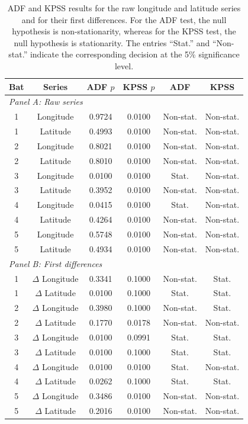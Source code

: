 \documentclass[preprint,12pt,authoryear]{elsarticle}
\begin{document}
\begin{table}[!h]
\centering
\normalsize
\setlength{\tabcolsep}{3pt}
\renewcommand{\arraystretch}{0.85}
\begin{tabular}{@{}cccccc@{}}
\toprule
\textbf{Bat} & \textbf{Series} & \textbf{ADF $p$} & \textbf{KPSS $p$} & \textbf{ADF} & \textbf{KPSS} \\
\midrule
\multicolumn{6}{l}{\textit{Panel A: Raw series}} \\
\midrule
1 & Longitude & 0.9724 & 0.0100 & Non-stat. & Non-stat. \\
1 & Latitude  & 0.4993 & 0.0100 & Non-stat. & Non-stat. \\
2 & Longitude & 0.8021 & 0.0100 & Non-stat. & Non-stat. \\
2 & Latitude  & 0.8010 & 0.0100 & Non-stat. & Non-stat. \\
3 & Longitude & 0.0100 & 0.0100 & Stat.     & Non-stat. \\
3 & Latitude  & 0.3952 & 0.0100 & Non-stat. & Non-stat. \\
4 & Longitude & 0.0415 & 0.0100 & Stat.     & Non-stat. \\
4 & Latitude  & 0.4264 & 0.0100 & Non-stat. & Non-stat. \\
5 & Longitude & 0.5748 & 0.0100 & Non-stat. & Non-stat. \\
5 & Latitude  & 0.4934 & 0.0100 & Non-stat. & Non-stat. \\
\midrule
\multicolumn{6}{l}{\textit{Panel B: First differences}} \\
\midrule
1 & $\Delta$ Longitude & 0.3341 & 0.1000 & Non-stat. & Stat.     \\
1 & $\Delta$ Latitude  & 0.0100 & 0.1000 & Stat.     & Stat.     \\
2 & $\Delta$ Longitude & 0.3980 & 0.1000 & Non-stat. & Stat.     \\
2 & $\Delta$ Latitude  & 0.1770 & 0.0178 & Non-stat. & Non-stat. \\
3 & $\Delta$ Longitude & 0.0100 & 0.0991 & Stat.     & Stat.     \\
3 & $\Delta$ Latitude  & 0.0100 & 0.1000 & Stat.     & Stat.     \\
4 & $\Delta$ Longitude & 0.0100 & 0.0100 & Stat.     & Non-stat. \\
4 & $\Delta$ Latitude  & 0.0262 & 0.1000 & Stat.     & Stat.     \\
5 & $\Delta$ Longitude & 0.3486 & 0.0100 & Non-stat. & Non-stat. \\
5 & $\Delta$ Latitude  & 0.2016 & 0.0100 & Non-stat. & Non-stat. \\
\bottomrule
\end{tabular}
\caption{ADF and KPSS results for the raw longitude and latitude series and for their first differences. For the ADF test, the null hypothesis is non-stationarity, whereas for the KPSS test, the null hypothesis is stationarity. The entries ``Stat.'' and ``Non-stat.'' indicate the corresponding decision at the 5\% significance level.}
\label{tab:adf_kpss}
\end{table}
\endgroup
\end{document}
